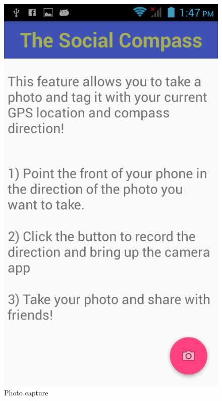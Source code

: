 \documentclass[12pt]{article}
\begin{document}
\begin{figure}[H]
    \centering
    \begin{minipage}[b]{.3\textwidth} 
        \centering  
        \includegraphics[scale=1.2, width=\linewidth]{photo1.png}     
        \caption{Photo capture}  
    \end{minipage}    
    \hfill
    \begin{minipage}[b]{.3\textwidth}  
        \centering  

\end{minipage}
\end{figure}
\end{document}

